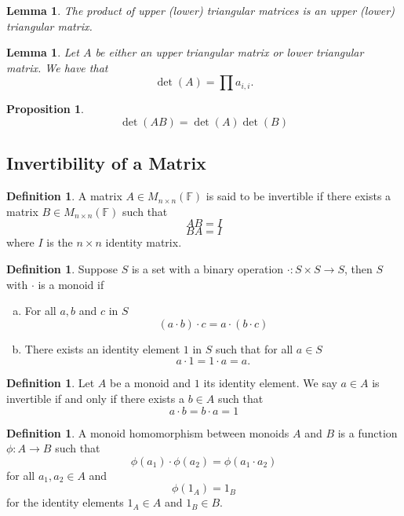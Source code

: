 \documentclass[12pt,letterpaper]{article}
\theoremstyle{plain}
\newtheorem{proposition}{Proposition}[section]
\newtheorem{lemma}[theorem]{Lemma}
\theoremstyle{definition}
\newtheorem{definition}[theorem]{Definition}
\numberwithin{equation}{section}
\begin{document}
\begin{lemma} The product of upper (lower) triangular matrices is an upper (lower) triangular matrix.
\end{lemma}

\begin{lemma}\label{det tri}
Let $A$ be either an upper triangular matrix or lower triangular matrix. We have that 
\[\det(A)=\prod a_{i,i}.\]
\end{lemma}


\begin{proposition}\label{multiplicativeid}
\[\det(AB)=\det(A)\det(B)\]
\end{proposition}

\subsection{Invertibility of a Matrix}
\begin{definition}A matrix $A\in M_{n\times n}(\mathbb{F})$ is said to be invertible if there exists a matrix $B\in M_{n\times n}(\mathbb{F})$ such that 
\[AB=I\]
\[BA=I\]
where $I$ is the $n\times n$ identity matrix. 
\end{definition}

\begin{definition}
Suppose $S$ is a set with a binary operation $\cdot :S\times S\rightarrow S$, then $S$ with $\cdot$ is a monoid if 
\begin{enumerate}[(a)]
\item For all $a, b$ and $c$ in $S$ 
\[(a\cdot b)\cdot c=a\cdot (b\cdot c)\]
\item There exists an identity element $1$ in $S$ such that for all $a\in S$
\[a\cdot 1=1\cdot a=a.\]
\end{enumerate}
\end{definition}

\begin{definition}
Let $A$ be a monoid and $1$ its identity element. We say $a\in A$ is invertible if and only if there exists a $b\in A$ such that
\[a\cdot b=b\cdot a=1\]
\end{definition}

\begin{definition}
A monoid homomorphism between monoids $A$ and $B$ is a function $\phi:A\rightarrow B$ such that 
\[\phi(a_1)\cdot \phi(a_2)=\phi(a_1\cdot a_2)\]
for all $a_1, a_2\in A$ 
and \[\phi(1_A)=1_B\] for the identity elements $1_A\in A$ and $1_B\in B$.
\end{definition}
\end{document}
